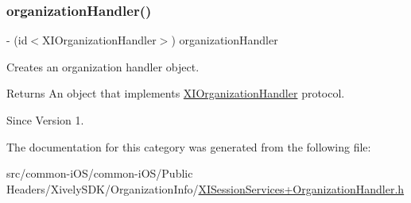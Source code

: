 \subsubsection{\texorpdfstring{organization\+Handler()}{organizationHandler()}}
{\footnotesize\ttfamily -\/ (id$<$X\+I\+Organization\+Handler$>$) organization\+Handler \begin{DoxyParamCaption}{ }\end{DoxyParamCaption}}



Creates an organization handler object. 

\begin{DoxyReturn}{Returns}
An object that implements \hyperlink{}{X\+I\+Organization\+Handler} protocol. 
\end{DoxyReturn}
\begin{DoxySince}{Since}
Version 1. 
\end{DoxySince}


The documentation for this category was generated from the following file\+:\begin{DoxyCompactItemize}
\item 
src/common-\/i\+O\+S/common-\/i\+O\+S/\+Public Headers/\+Xively\+S\+D\+K/\+Organization\+Info/\hyperlink{_x_i_session_services_09_organization_handler_8h}{X\+I\+Session\+Services+\+Organization\+Handler.\+h}\end{DoxyCompactItemize}

